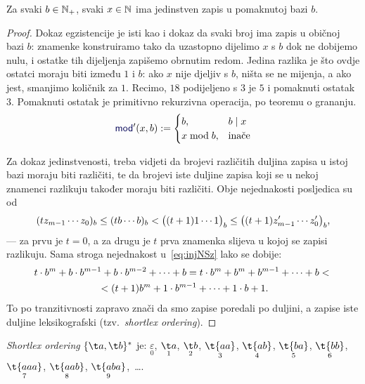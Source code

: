 \begin{lema}\label{lm:pomakbaza}
Za svaki $b\in{\mathbb N}_+$, svaki $x\in{\mathbb N}$ ima jedinstven zapis u pomaknutoj bazi $b$.
\end{lema}
\begin{proof}
Dokaz egzistencije je isti kao i dokaz da svaki broj ima zapis u običnoj bazi $b$: znamenke konstruiramo tako da uzastopno dijelimo $x$ s $b$ dok ne dobijemo nulu, i ostatke tih dijeljenja zapišemo obrnutim redom. Jedina razlika je što ovdje ostatci moraju biti između $1$ i $b$: ako $x$ nije djeljiv s $b$, ništa se ne mijenja, a ako jest, smanjimo količnik za $1$. Recimo, $18$ podijeljeno s $3$ je $5$ i pomaknuti ostatak $3$. Pomaknuti ostatak je primitivno rekurzivna operacija, po teoremu o grananju.
\begin{equation}
    \f{mod}'(x,b):=\begin{cases}
        b,&b\mid x\\
        x\bmod b,&\text{inače}
    \end{cases}
\end{equation}

Za dokaz jedinstvenosti, treba vidjeti da brojevi različitih duljina zapisa u istoj bazi moraju biti različiti, te da brojevi iste duljine zapisa koji se u nekoj znamenci razlikuju također moraju biti različiti. Obje nejednakosti posljedica su od
\begin{equation}
\label{eq:injNSz}
    (tz_{m-1}\dotsm z_0)_b\le
    (tb\dotsm b)_b<
    \bigl((t+1)1\dotsm1\bigr)_b\le
    \bigl((t+1)z_{m-1}'\dotsm z_0'\bigr)_b\text,
\end{equation}
--- za prvu je $t=0$, a za drugu je $t$ prva znamenka slijeva u kojoj se zapisi razlikuju. Sama stroga nejednakost u~\eqref{eq:injNSz} lako se dobije:
\begin{multline}
    t\cdot b^m+b\cdot b^{m-1}+b\cdot b^{m-2}+\dotsb+b=
    t\cdot b^m+b^m+b^{m-1}+\dotsb+b<{}\\
    {}<(t+1)b^m+1\cdot b^{m-1}+\dotsb+1\cdot b+1\text.
\end{multline}
To po tranzitivnosti zapravo znači da smo zapise poredali po duljini, a zapise iste duljine leksikografski (tzv.\ \emph{shortlex ordering}).
\end{proof}

\begin{primjer}
\emph{Shortlex ordering} $\{\t a,\t b\}^*$ je: $\underset{0}{\varepsilon}$, 
$\underset{1}{\t a}$, 
$\underset{2}{\t b}$, 
$\underset{3}{\t{aa}}$, 
$\underset{4}{\t{ab}}$,
$\underset{5}{\t{ba}}$, 
$\underset{6}{\t{bb}}$,
$\underset{7}{\t{aaa}}$,
$\underset{8}{\t{aab}}$,
$\underset{9}{\t{aba}}$,~\ldots.
\end{primjer}

